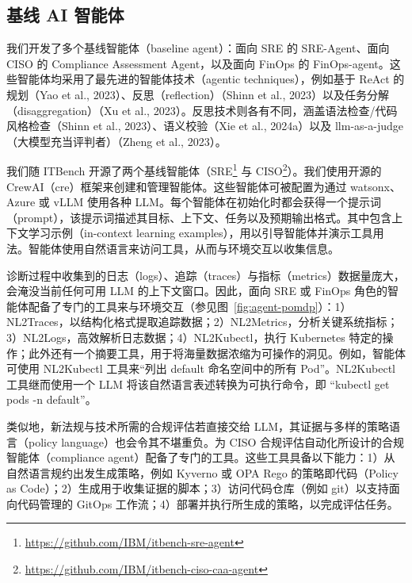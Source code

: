 \subsection{基线 AI 智能体}

我们开发了多个基线智能体（baseline agent）：面向 SRE 的 SRE-Agent、面向 CISO 的 Compliance Assessment Agent，以及面向 FinOps 的 FinOps-agent。这些智能体均采用了最先进的智能体技术（agentic techniques），例如基于 ReAct 的规划（Yao et al., 2023）、反思（reflection）（Shinn et al., 2023）以及任务分解（disaggregation）（Xu et al., 2023）。反思技术则各有不同，涵盖语法检查/代码风格检查（Shinn et al., 2023）、语义校验（Xie et al., 2024a）以及 llm-as-a-judge（大模型充当评判者）（Zheng et al., 2023）。

我们随 ITBench 开源了两个基线智能体（SRE\footnote{\url{https://github.com/IBM/itbench-sre-agent}} 与 CISO\footnote{\url{https://github.com/IBM/itbench-ciso-caa-agent}}）。我们使用开源的 CrewAI（cre）框架来创建和管理智能体。这些智能体可被配置为通过 watsonx、Azure 或 vLLM 使用各种 LLM。每个智能体在初始化时都会获得一个提示词（prompt），该提示词描述其目标、上下文、任务以及预期输出格式。其中包含上下文学习示例（in-context learning examples），用以引导智能体并演示工具用法。智能体使用自然语言来访问工具，从而与环境交互以收集信息。

诊断过程中收集到的日志（logs）、追踪（traces）与指标（metrics）数据量庞大，会淹没当前任何可用 LLM 的上下文窗口。因此，面向 SRE 或 FinOps 角色的智能体配备了专门的工具来与环境交互（参见图~\ref{fig:agent-pomdp}）：1）NL2Traces，以结构化格式提取追踪数据；2）NL2Metrics，分析关键系统指标；3）NL2Logs，高效解析日志数据；4）NL2Kubectl，执行 Kubernetes 特定的操作；此外还有一个摘要工具，用于将海量数据浓缩为可操作的洞见。例如，智能体可使用 NL2Kubectl 工具来“列出 default 命名空间中的所有 Pod”。NL2Kubectl 工具继而使用一个 LLM 将该自然语言表述转换为可执行命令，即 “kubectl get pods -n default”。

类似地，新法规与技术所需的合规评估若直接交给 LLM，其证据与多样的策略语言（policy language）也会令其不堪重负。为 CISO 合规评估自动化所设计的合规智能体（compliance agent）配备了专门的工具。这些工具具备以下能力：1）从自然语言规约出发生成策略，例如 Kyverno 或 OPA Rego 的策略即代码（Policy as Code）；2）生成用于收集证据的脚本；3）访问代码仓库（例如 git）以支持面向代码管理的 GitOps 工作流；4）部署并执行所生成的策略，以完成评估任务。

